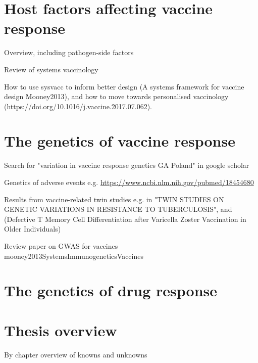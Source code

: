 \section{Host factors affecting vaccine response}

Overview, including pathogen-side factors

Review of systems vaccinology

How to use sysvacc to inform better design (A systems framework for vaccine design Mooney2013), and how to move towards personalised vaccinology (https://doi.org/10.1016/j.vaccine.2017.07.062).

\section{The genetics of vaccine response}

Search for "variation in vaccine response genetics GA Poland" in google scholar

Genetics of adverse events e.g. \url{https://www.ncbi.nlm.nih.gov/pubmed/18454680}

Results from vaccine-related twin studies e.g. in "TWIN STUDIES ON GENETIC VARIATIONS IN RESISTANCE TO TUBERCULOSIS", and (Defective T Memory Cell Differentiation after Varicella Zoster Vaccination in Older Individuals)

Review paper on GWAS for vaccines mooney2013SystemsImmunogeneticsVaccines

\section{The genetics of drug response}

\section{Thesis overview}

By chapter overview of knowns and unknowns



